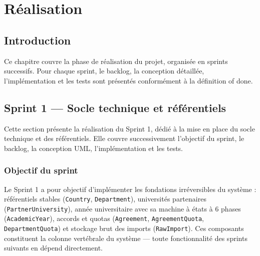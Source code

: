 \chapter{Réalisation}
\begingroup
\let\clearpage\relax
\startcontents[chapters]
\endgroup
\newpage

\section*{Introduction}
\justifying
{}
{}

Ce chapitre couvre la phase de réalisation du projet, organisée en
sprints successifs. Pour chaque sprint, le backlog, la conception
détaillée, l'implémentation et les tests sont présentés conformément
à la définition of done.

\section{{Sprint 1 — Socle technique et référentiels}}

Cette section présente la réalisation du Sprint 1, dédié à la mise en place du socle technique et des référentiels. Elle couvre successivement l'objectif du sprint, le backlog, la conception UML, l'implémentation et les tests.

\subsection{Objectif du sprint}

Le Sprint 1 a pour objectif d'implémenter les fondations irréversibles du système : référentiels stables (\texttt{Country}, \texttt{Department}), universités partenaires (\texttt{PartnerUniversity}), année universitaire avec sa machine à états à 6 phases (\texttt{AcademicYear}), accords et quotas (\texttt{Agreement}, \texttt{AgreementQuota}, \texttt{DepartmentQuota}) et stockage brut des imports (\texttt{RawImport}). Ces composants constituent la colonne vertébrale du système — toute fonctionnalité des sprints suivants en dépend directement.

